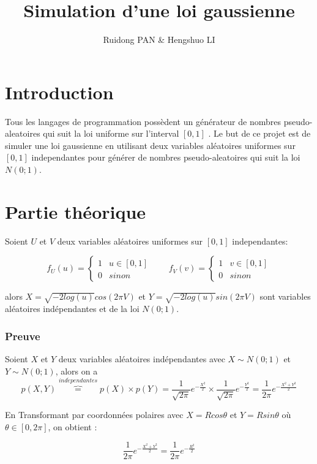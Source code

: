 \documentclass[]{article}
\date{}
\begin{document}
\title{Simulation d'une loi gaussienne}
\author{Ruidong PAN \& Hengshuo LI}
\maketitle

\part*{Introduction}

Tous les langages de programmation possèdent un générateur de nombres
pseudo-aleatoires qui suit la loi uniforme sur l'interval $[0,1]$
. Le but de ce projet est de simuler une loi gaussienne en utilisant
deux variables aléatoires uniformes sur $[0,1]$ independantes pour
générer de nombres pseudo-aleatoires qui suit la loi $N(0;1)$.

\part*{Partie théorique }

Soient $U$ et $V$ deux variables aléatoires uniformes sur $[0,1]$
independantes:

\[
f_{U}(u)=\begin{cases}
1 & u\in\left[0,1\right]\\
0 & sinon
\end{cases}\qquad f_{V}(v)=\begin{cases}
1 & v\in\left[0,1\right]\\
0 & sinon
\end{cases}
\]

alors $X=\sqrt{-2log(u)}cos(2\pi V)$ et $Y=\sqrt{-2log(u)}sin(2\pi V)$
sont variables aléatoires indépendantes et de la loi $N(0;1)$.

\section*{Preuve}

Soient $X$ et $Y$ deux variables aléatoires indépendantes avec $X\sim N(0;1)$
et $Y\sim N(0;1)$, alors on a
\[
p(X,Y)\overbrace{=}^{ind\acute{e}pendantes}p(X)\times p(Y)=\frac{1}{\sqrt{2\pi}}e^{-\frac{X^{2}}{2}}\times\frac{1}{\sqrt{2\pi}}e^{-\frac{Y^{2}}{2}}=\frac{1}{2\pi}e^{-\frac{X^{2}+Y^{2}}{2}}
\]

En Transformant par coordonnées polaires avec $X=Rcos\theta$ et $Y=Rsin\theta$
où $\theta\in[0,2\pi]$, on obtient :

\[
\frac{1}{2\pi}e^{-\frac{X^{2}+Y^{2}}{2}}=\frac{1}{2\pi}e^{-\frac{R^{2}}{2}}
\]
\end{document}
